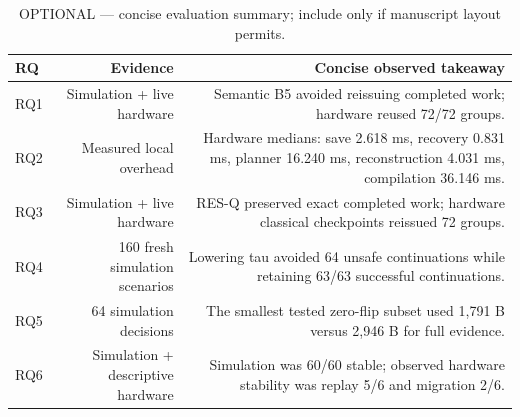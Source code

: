 \begin{table}[t]
\centering
\small
\begin{tabular}{@{}lrr@{}}
\toprule
RQ & Evidence & Concise observed takeaway \\
\midrule
RQ1 & Simulation + live hardware & Semantic B5 avoided reissuing completed work; hardware reused 72/72 groups. \\
RQ2 & Measured local overhead & Hardware medians: save 2.618 ms, recovery 0.831 ms, planner 16.240 ms, reconstruction 4.031 ms, compilation 36.146 ms. \\
RQ3 & Simulation + live hardware & RES-Q preserved exact completed work; hardware classical checkpoints reissued 72 groups. \\
RQ4 & 160 fresh simulation scenarios & Lowering tau avoided 64 unsafe continuations while retaining 63/63 successful continuations. \\
RQ5 & 64 simulation decisions & The smallest tested zero-flip subset used 1,791 B versus 2,946 B for full evidence. \\
RQ6 & Simulation + descriptive hardware & Simulation was 60/60 stable; observed hardware stability was replay 5/6 and migration 2/6. \\
\bottomrule
\end{tabular}
\caption{OPTIONAL --- concise evaluation summary; include only if manuscript layout permits.}
\label{tab:evaluation-summary-optional}
\end{table}
